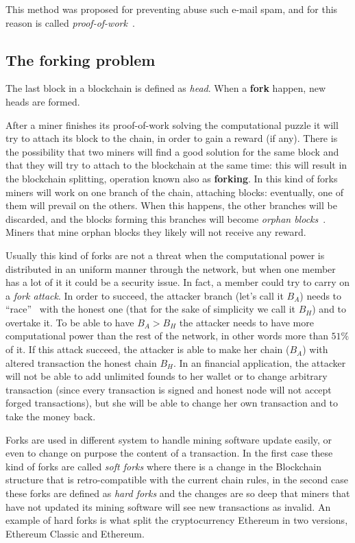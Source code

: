 This method was proposed for preventing abuse such e-mail spam, and for this
reason is called \textit{proof-of-work}~\cite{back02}.

\subsection{The forking problem}
\label{sub:tfp}

The last block in a blockchain is defined as \textit{head}. When a
\textbf{fork} happen, new heads are formed.

After a miner finishes its proof-of-work solving the computational puzzle
it will try to attach its block to the chain, in order to gain a reward (if
any). There is the possibility that two miners will find a good solution for
the same block and that they will try to attach to the blockchain at the same
time: this will result in the blockchain splitting, operation known also as
\textbf{forking}. In this kind of forks miners will work on one branch of the
chain, attaching blocks: eventually, one of them will prevail on the others.
When this happens, the other branches will be discarded, and the blocks
forming this branches will become \textit{orphan blocks}~\cite{decker13}.
Miners that mine orphan blocks they likely will not receive any reward.

Usually this kind of forks are not a threat when the computational power is
distributed in an uniform manner through the network, but when one member has a
lot of it it could be a security issue. In fact, a member could try to carry on
a \textit{fork attack}. In order to succeed, the attacker branch (let's call it
$B_A$) needs to ``race''~\cite{nakamoto08} with the honest one (that for the
sake of simplicity we call it $B_H$) and to overtake it. To be able to have
$B_A > B_H$ the attacker needs to have more computational power than the rest of
the network, in other words more than $51\%$ of it.
If this attack succeed, the attacker is able to make her chain ($B_A$) with
altered transaction the honest chain $B_H$.
In an financial application, the attacker will not be able to add unlimited
founds to her wallet or to change arbitrary transaction (since every
transaction is signed and honest node will not accept forged transactions), but
she will be able to change her own transaction and to take the money back.

Forks are used in different system to handle mining software update easily, or
even to change on purpose the content of a transaction\cite{sok15}. In the
first case these kind of forks are called \textit{soft forks} where there is a
change in the Blockchain structure that is retro-compatible with the current
chain rules, in the second case these forks are defined as \textit{hard forks}
and the changes are so deep that miners that have not updated its mining
software will see new transactions as invalid. An example of hard forks is what
split the cryptocurrency Ethereum in two versions, Ethereum Classic and
Ethereum.

